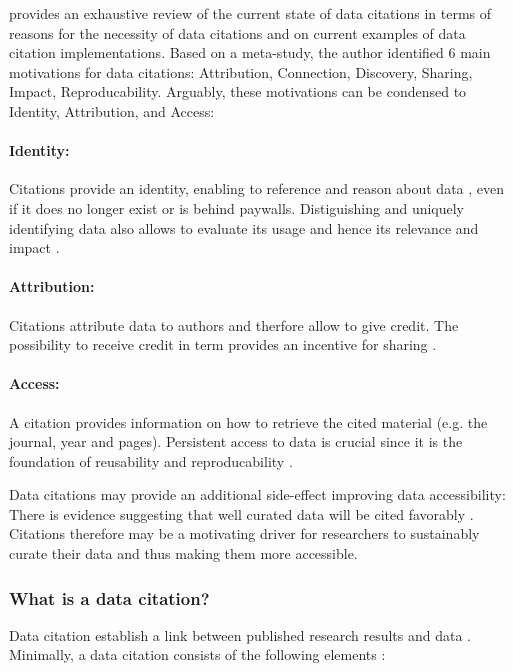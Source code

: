 \documentclass[letterpaper, parskip=half]{scrartcl}
\begin{document}
\cite{Silvello2017} provides an exhaustive review of the current state of data citations in terms of reasons for the necessity of data citations and on current examples of data citation implementations. Based on a meta-study, the author identified 6 main motivations for data citations: Attribution, Connection, Discovery, Sharing, Impact, Reproducability. 
Arguably, these motivations can be condensed to Identity, Attribution, and Access: 

\paragraph{Identity:} 
Citations provide an identity, enabling to reference and reason about data \citep{Bandrowski2016}, even if it does no longer exist or is behind paywalls. 
Distiguishing and uniquely identifying data also allows to evaluate its usage and hence its relevance and impact \citep{Honor2016}.

\paragraph{Attribution:}
Citations attribute data to authors and therfore allow to give credit.
The possibility to receive credit in term provides an incentive for sharing \citep{Niemeyer2016, Callaghan2012, Kratz2014}. 



\paragraph{Access:} 
A citation provides information on how to retrieve the cited material (e.g. the journal, year and pages). Persistent access to data is crucial since it is the foundation of reusability and reproducability \citep{Starr2015}. 

Data citations may provide an additional side-effect improving data accessibility: There is evidence suggesting that well curated data will be cited favorably \citep{Belter2014}. Citations therefore may be a motivating driver for researchers to sustainably curate their data and thus making them more accessible.


\subsubsection{What is a data citation?}
Data citation establish a link between published research results and data \citep{CODATA2013}. Minimally, a data citation consists of the following elements \citep{Cook2016}:
\end{document}
